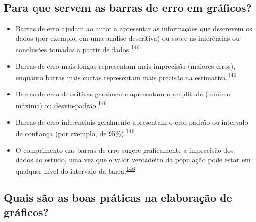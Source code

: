 \documentclass[
  a4paper,
]{book}
\begin{document}
\hypertarget{para-que-servem-as-barras-de-erro-em-gruxe1ficos}{%
\subsection{Para que servem as barras de erro em gráficos?}\label{para-que-servem-as-barras-de-erro-em-gruxe1ficos}}

\begin{itemize}
\item
  Barras de erro ajudam ao autor a apresentar as informações que descrevem os dados (por exemplo, em uma análise descritiva) ou sobre as inferências ou conclusões tomadas a partir de dados.\textsuperscript{\protect\hyperlink{ref-Cumming2007}{146}}
\item
  Barras de erro mais longas representam mais imprecisão (maiores erros), enquanto barras mais curtas representam mais precisão na estimativa.\textsuperscript{\protect\hyperlink{ref-Cumming2007}{146}}
\item
  Barras de erro descritivas geralmente apresentam a amplitude (mínimo-máximo) ou desvio-padrão.\textsuperscript{\protect\hyperlink{ref-Cumming2007}{146}}
\item
  Barras de erro inferenciais geralmente apresentam o erro-padrão ou intervalo de confiança (por exemplo, de 95\%).\textsuperscript{\protect\hyperlink{ref-Cumming2007}{146}}
\item
  O comprimento das barras de erro sugere graficamente a imprecisão dos dados do estudo, uma vez que o valor verdadeiro da população pode estar em qualquer nível do intervalo da barra.\textsuperscript{\protect\hyperlink{ref-Cumming2007}{146}}
\end{itemize}

\hypertarget{quais-suxe3o-as-boas-pruxe1ticas-na-elaborauxe7uxe3o-de-gruxe1ficos}{%
\subsection{Quais são as boas práticas na elaboração de gráficos?}\label{quais-suxe3o-as-boas-pruxe1ticas-na-elaborauxe7uxe3o-de-gruxe1ficos}}
\end{document}
